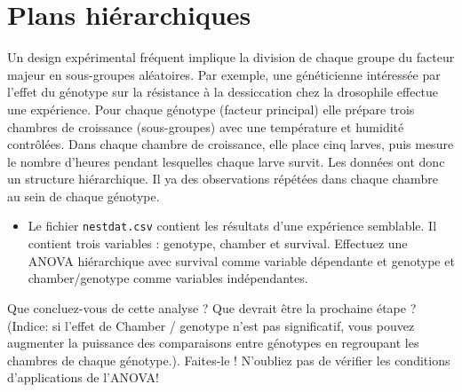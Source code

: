 \documentclass[
  12pt,
]{book}
\newenvironment{Shaded}{\begin{snugshade}}{\end{snugshade}}
\newcommand{\DataTypeTok}[1]{\textcolor[rgb]{0.13,0.29,0.53}{#1}}
\newcommand{\KeywordTok}[1]{\textcolor[rgb]{0.13,0.29,0.53}{\textbf{#1}}}
\newcommand{\NormalTok}[1]{#1}
\newcommand{\OperatorTok}[1]{\textcolor[rgb]{0.81,0.36,0.00}{\textbf{#1}}}
\newcommand{\StringTok}[1]{\textcolor[rgb]{0.31,0.60,0.02}{#1}}
\providecommand{\tightlist}{%
  \setlength{\itemsep}{0pt}\setlength{\parskip}{0pt}}
\begin{document}
\hypertarget{plans-hiuxe9rarchiques}{%
\section{Plans hiérarchiques}\label{plans-hiuxe9rarchiques}}

Un design expérimental fréquent implique la division de chaque groupe du facteur majeur en sous-groupes aléatoires. Par exemple, une généticienne intéressée par l'effet du génotype sur la résistance à la dessiccation chez la drosophile effectue une expérience. Pour chaque génotype (facteur principal) elle prépare trois chambres de croissance (sous-groupes) avec une température et humidité contrôlées. Dans chaque chambre de croissance, elle place cinq larves, puis mesure le nombre d'heures pendant lesquelles chaque larve survit. Les données ont donc un structure hiérarchique. Il ya des observations répétées dans chaque chambre au sein de chaque génotype.

\begin{itemize}
\tightlist
\item
  Le fichier \texttt{nestdat.csv} contient les résultats d'une expérience semblable. Il contient trois variables : genotype, chamber et survival. Effectuez une ANOVA hiérarchique avec survival comme variable dépendante et genotype et chamber/genotype comme variables indépendantes.
\end{itemize}

\begin{Shaded}
\end{Shaded}

Que concluez-vous de cette analyse ? Que devrait être la prochaine étape ? (Indice: si l'effet de Chamber / genotype n'est pas significatif, vous pouvez augmenter la puissance des comparaisons entre génotypes en regroupant les chambres de chaque génotype.). Faites-le ! N'oubliez pas de vérifier les conditions d'applications de l'ANOVA!
\end{document}
